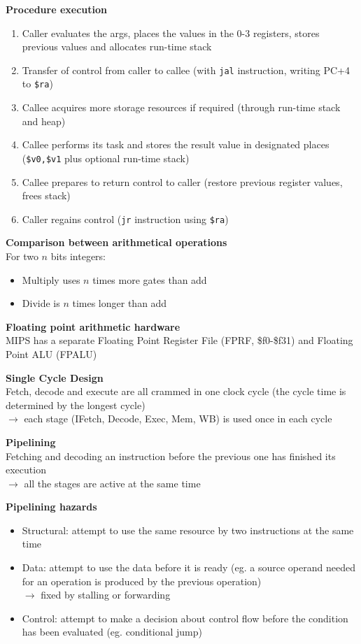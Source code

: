 \documentclass[10pt,letterpaper,landscape]{report}
\newcommand{\boxheight}{21.59cm}
\newcommand{\boxwidth}{8.85cm}
\begin{document}
\begin{small}
{\begin{minipage}[t][\boxheight][c]{\boxwidth}
	\textbf{Procedure execution}
	\begin{enumerate}
		\item Caller evaluates the args, places the values in the 0-3 registers, stores previous values and allocates run-time stack
		\item Transfer of control from caller to callee (with \texttt{jal} instruction, writing PC+4 to \texttt{\$ra})
		\item Callee acquires more storage resources if required (through run-time stack and heap)
		\item Callee performs its task and stores the result value in designated places (\texttt{\$v0,\$v1} plus optional run-time stack)
		\item Callee prepares to return control to caller (restore previous register values, frees stack)
		\item Caller regains control (\texttt{jr} instruction using \texttt{\$ra})
	\end{enumerate}

	\textbf{Comparison between arithmetical operations}\\
	For two $n$ bits integers:
	\begin{itemize}
		\item Multiply uses $n$ times more gates than add
		\item Divide is $n$ times longer than add
	\end{itemize}
	
	\textbf{Floating point arithmetic hardware}\\
	MIPS has a separate Floating Point Register File (FPRF, \$f0-\$f31) and Floating Point ALU (FPALU) 
	
	\textbf{Single Cycle Design}\\
	Fetch, decode and execute are all crammed in one clock cycle (the cycle time is determined by the longest cycle)\\
	$\rightarrow$ each stage (IFetch, Decode, Exec, Mem, WB) is used once in each cycle
	
	\textbf{Pipelining}\\
	Fetching and decoding an instruction before the previous one has finished its execution\\
	$\rightarrow$ all the stages are active at the same time
	
	\textbf{Pipelining hazards}
	\begin{itemize}
		\item Structural: attempt to use the same resource by two instructions at the same time 
		\item Data: attempt to use the data before it is ready (eg. a source operand needed for an operation is produced by the previous operation)\\
		$\rightarrow$ fixed by stalling or forwarding
		\item Control: attempt to make a decision about control flow before the condition has been evaluated (eg. conditional jump) 
	\end{itemize}



\end{minipage}}
\end{small}
\end{document}
